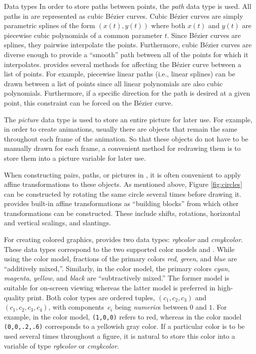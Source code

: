 \begin{section}{Data types}
In order to store paths between points, the \textit{path} data type is
used.  All paths in \MP{} are represented as cubic B\'{e}zier curves.
Cubic B\'{e}zier curves are simply parametric splines of the form
$(x(t),y(t))$ where both $x(t)$ and $y(t)$ are piecewise cubic
polynomials of a common parameter $t$.  Since B\'{e}zier curves are
splines, they pairwise interpolate the points.  Furthermore, cubic
B\'{e}zier curves are diverse enough to provide a ``smooth'' path
between all of the points for which it interpolates.  \MP{} provides
several methods for affecting the B\'{e}zier curve between a list of
points.  For example, piecewise linear paths (i.e., linear splines) can
be drawn between a list of points since all linear polynomials are also
cubic polynomials.  Furthermore, if a specific direction for the path is
desired at a given point, this constraint can be forced on the
B\'{e}zier curve.

The \textit{picture} data type is used to store an entire picture for
later use.  For example, in order to create animations, usually there
are objects that remain the same throughout each frame of the animation.
So that these objects do not have to be manually drawn for each frame, a
convenient method for redrawing them is to store them into a picture
variable for later use.

When constructing pairs, paths, or pictures in \MP{}, it is often
convenient to apply affine transformations to these objects.  As
mentioned above, Figure \ref{fig:circles} can be constructed by rotating
the same circle several times before drawing it.  \MP{} provides
built-in affine transformations as ``building blocks'' from which other
transformations can be constructed.  These include shifts, rotations,
horizontal and vertical scalings, and slantings.

For creating colored graphics, \MP{} provides two data types:
\textit{rgbcolor} and \textit{cmykcolor}.  These data types correspond to the two
supported color models \RGB{} and \CMYK.  While using the \RGB{} color model,
fractions of the primary colors \textit{red}, \textit{green}, and
\textit{blue} are ``additively mixed,''.  Similarly, in the \CMYK{} color model, the primary
colors \textit{cyan}, \textit{magenta}, \textit{yellow}, and
\textit{black} are ``subtractively mixed.''  The former model is
suitable for on-screen viewing whereas the latter model is preferred in
high-quality print.  Both color types are ordered tuples,
$(c_1,c_2,c_3)$ and $(c_1,c_2,c_3,c_4)$, with components~$c_i$ being
\textit{numeric}s between $0$ and $1$.  For example, in the \RGB{} color
model, \texttt{(1,0,0)} refers to red, whereas in the \CMYK{} color model
\texttt{(0,0,.2,.6)} corresponds to a yellowish gray color.  If a
particular color is to be used several times throughout a figure, it is
natural to store this color into a variable of type \textit{rgbcolor} or
\textit{cmykcolor}.


\end{section}
